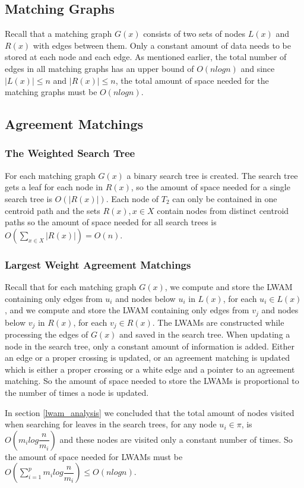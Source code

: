 \subsection{Matching Graphs}
Recall that a matching graph $G(x)$ consists of two sets of nodes $L(x)$ and $R(x)$ with edges between them. Only a constant amount of data needs to be stored at each node and each edge. As mentioned earlier, the total number of edges in all matching graphs has an upper bound of $O(nlogn)$ and since $|L(x)| \le n$ and $|R(x)| \le n$, the total amount of space needed for the matching graphs must be $O(nlogn)$.

\subsection{Agreement Matchings}
\subsubsection{The Weighted Search Tree}
For each matching graph $G(x)$ a binary search tree is created. The search tree gets a leaf for each node in $R(x)$, so the amount of space needed for a single search tree is $O(|R(x)|)$. Each node of $T_2$ can only be contained in one centroid path and the sets $R(x), x \in X$ contain nodes from distinct centroid paths so the amount of space needed for all search trees is $O(\sum_{x \in X} |R(x)|) = O(n)$.

\subsubsection{Largest Weight Agreement Matchings}
Recall that for each matching graph $G(x)$, we compute and store the LWAM containing only edges from $u_i$ and nodes below $u_i$ in $L(x)$, for each $u_i \in L(x)$, and we compute and store the LWAM containing only edges from $v_j$ and nodes below $v_j$ in $R(x)$, for each $v_j \in R(x)$. The LWAMs are constructed while processing the edges of $G(x)$ and saved in the search tree. When updating a node in the search tree, only a constant amount of information is added. Either an edge or a proper crossing is updated, or an agreement matching is updated which is either a proper crossing or a white edge and a pointer to an agreement matching. So the amount of space needed to store the LWAMs is proportional to the number of times a node is updated.

In section \ref{lwam_analysis} we concluded that the total amount of nodes visited when searching for leaves in the search trees, for any node $u_i \in \pi$, is $O(m_ilog\dfrac{n}{m_i})$ and these nodes are visited only a constant number of times. So the amount of space needed for LWAMs must be  $O(\sum_{i=1}^p m_ilog\dfrac{n}{m_i}) \le O(nlogn)$.

